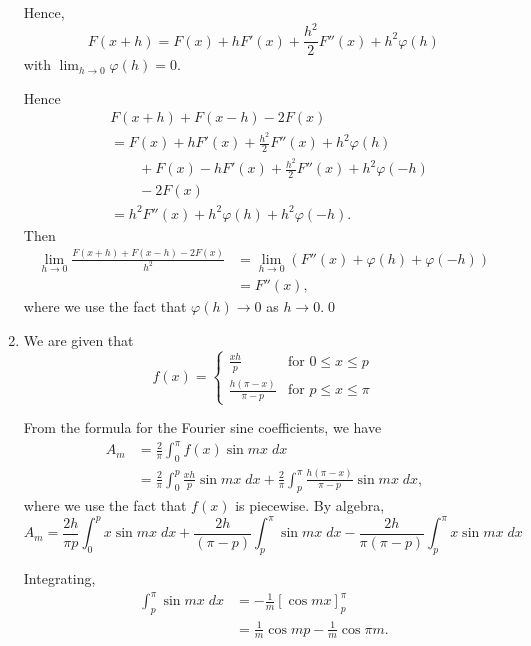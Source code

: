 \documentclass[oneside]{article}
\begin{document}
\begin{enumerate}[label=\textbf{\arabic*.}]
Hence,\[
  F(x+h) = F(x) + hF'(x) + \frac{h^2}{2}F''(x) + h^2\varphi(h)
\] with $\lim_{h\to0}\varphi(h) = 0$.

Hence\begin{align*}
  &F(x+h) + F(x-h) - 2F(x) \\
  &= F(x) + hF'(x) + \frac{h^2}{2}F''(x) + h^2\varphi(h) \\
  &\qquad+ F(x) - hF'(x) + \frac{h^2}{2}F''(x) + h^2\varphi(-h) \\
  &\qquad- 2F(x) \\
  &= h^2F''(x) + h^2\varphi(h) + h^2\varphi(-h) \text{.}
\end{align*} Then \begin{align*}
  \lim_{h\to0}\frac{F(x+h) + F(x-h) - 2F(x)}{h^2}
  &= \lim_{h\to0}\left(F''(x) + \varphi(h) + \varphi(-h)\right) \\
  &= F''(x)\text{,}
\end{align*} where we use the fact that $\varphi(h) \to 0$ as $h \to 0$.\qed

  \item
  We are given that \[
    f(x) = \begin{cases}
      \frac{xh}{p} & \text{for }0 \leq x \leq p \\
      \frac{h(\pi-x)}{\pi - p} & \text{for }p \leq x \leq \pi
    \end{cases}
  \]

  From the formula for the Fourier sine coefficients, we have\begin{align*}
    A_m &= \frac{2}{\pi} \int_0^\pi f(x)\sin mx\;dx \\
    &= \frac{2}{\pi} \int_0^p \frac{xh}{p}\sin mx\;dx
      + \frac{2}{\pi} \int_p^\pi \frac{h(\pi-x)}{\pi-p}\sin mx\;dx \text{,}
  \end{align*} where we use the fact that $f(x)$ is piecewise. By algebra,
  \begin{equation}
    \label{eq:am-before-integration}
    A_m = \frac{2h}{\pi p} \int_0^p x\sin mx\;dx
      + \frac{2h}{(\pi - p)} \int_p^\pi \sin mx\;dx
      - \frac{2h}{\pi(\pi - p)} \int_p^\pi x\sin mx\;dx
  \end{equation}

  Integrating,\begin{align*}
    \int_p^\pi \sin mx\;dx
    &= -\frac{1}{m}\left[\cos mx\right]_p^\pi \\
    &= \frac{1}{m}\cos mp - \frac{1}{m}\cos \pi m \text{.}
  \end{align*}


\end{enumerate}
\end{document}
